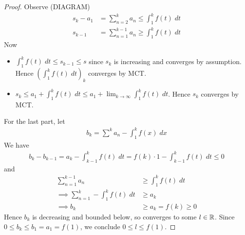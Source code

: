 \documentclass{../../template/note}
\begin{document}
    \begin{proof}
        Observe (DIAGRAM)
        \begin{align*}
            s_k - a_1 &= \sum_{n=2}^k a_n \leq \int_1^k f(t) \; dt \\
            s_{k-1} &= \sum_{n=1}^{k-1} a_n \geq \int_1^k f(t) \; dt
        \end{align*}
        Now
        \begin{itemize}
            \item[\(\implies\)] \(\int_1^k f(t) \; dt \leq s_{k-1} \leq s\) since \(s_k\) is increasing and converges by assumption. Hence \((\int_1^k f(t) \; dt)_k\) converges by MCT.
            \item[\(\impliedby\)] \(s_k \leq a_1 + \int_1^k f(t) \; dt \leq a_1 + \lim_{k \to \infty}\int_1^k f(t) \; dt\). Hence \(s_k\) converges by MCT. 
        \end{itemize}
        For the last part, let
        \begin{align*}
            b_k = \sum^k a_n - \int_1^k f(x) \; dx
        \end{align*}
        We have
        \begin{align*}
            b_k - b_{k-1} = a_k - \int_{k-1}^k f(t) \; dt = f(k) \cdot 1 - \int_{k-1}^k f(t) \; dt \leq 0
        \end{align*}
        and
        \begin{align*}
            \sum_{n=1}^{k-1} a_n &\geq \int_1^k f(t) \; dt \\
            \implies \sum_{n=1}^k - \int_1^k f(t) \; dt &\geq a_k \\
            \implies b_k &\geq a_k = f(k) \geq 0
        \end{align*}
        Hence \(b_k\) is decreasing and bounded below, so converges to some \(l \in \mathbb R\). Since \(0 \leq b_k \leq b_1 = a_1 = f(1)\), we conclude \(0 \leq l \leq f(1)\).
    \end{proof}
\end{document}
